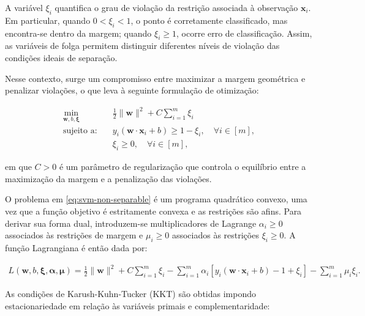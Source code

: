 A variável $\xi_i$ quantifica o grau de violação da restrição associada à observação
$\mathbf{x}_i$. Em particular, quando $0 < \xi_i < 1$, o ponto é corretamente classificado,
mas encontra-se dentro da margem; quando $\xi_i \geq 1$, ocorre erro de classificação.
Assim, as variáveis de folga permitem distinguir diferentes níveis de violação das condições
ideais de separação.

Nesse contexto, surge um compromisso entre maximizar a margem geométrica e penalizar
violações, o que leva à seguinte formulação de otimização:

\begin{equation}
\begin{aligned}
\min_{\mathbf{w}, b, \bm{\xi}} \quad & \frac{1}{2} \|\mathbf{w}\|^2 + C \sum_{i=1}^{m} \xi_i \\
\text{sujeito a:} \quad & \mathit{y}_i \left(\mathbf{w} \cdot \mathbf{x}_i + b\right) \geq 1 - \xi_i, \quad \forall i \in \left[\mathit{m}\right], \\
& \xi_i \geq 0, \quad \forall i \in \left[\mathit{m}\right],
\end{aligned}
\label{eq:svm-non-separable}
\end{equation}

em que $C > 0$ é um parâmetro de regularização que controla o equilíbrio entre a maximização
da margem e a penalização das violações.

O problema em \eqref{eq:svm-non-separable} é um programa quadrático convexo, uma vez que a
função objetivo é estritamente convexa e as restrições são afins. Para derivar sua forma
dual, introduzem-se multiplicadores de Lagrange $\alpha_i \geq 0$ associados às restrições
de margem e $\mu_i \geq 0$ associados às restrições $\xi_i \geq 0$. A função Lagrangiana é
então dada por:

\begin{equation}
\begin{aligned}
L(\mathbf{w}, b, \bm{\xi}, \bm{\alpha}, \bm{\mu}) =
\frac{1}{2} \|\mathbf{w}\|^2
+ C \sum_{i=1}^{m} \xi_i
- \sum_{i=1}^{m} \alpha_i \left[\mathit{y}_i (\mathbf{w} \cdot \mathbf{x}_i + b) - 1 + \xi_i \right]
- \sum_{i=1}^{m} \mu_i \xi_i.
\end{aligned}
\end{equation}

As condições de Karush-Kuhn-Tucker (KKT) são obtidas impondo estacionariedade em relação
às variáveis primais e complementaridade:

